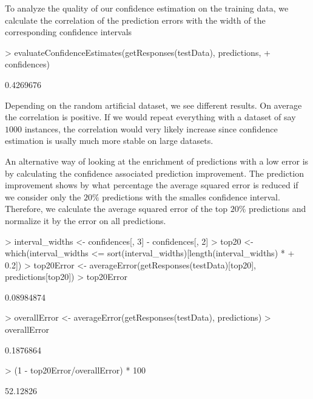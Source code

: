 \documentclass{article}
\begin{document}
To analyze the quality of our confidence estimation on the
training data, we calculate the correlation of the prediction
errors with the width of the corresponding confidence intervals

\begin{Schunk}
\begin{Sinput}
> evaluateConfidenceEstimates(getResponses(testData), predictions, 
+     confidences)
\end{Sinput}
\begin{Soutput}
[1] 0.4269676
\end{Soutput}
\end{Schunk}

Depending on the random artificial dataset, we see different
results.  On average the correlation is positive.
If we would repeat everything with
a dataset of say $1000$ instances, the correlation would very likely
increase since confidence estimation is usally much more stable on
large datasets.

An alternative way of looking at the enrichment of predictions with a
low error is by calculating the confidence associated prediction improvement.
The prediction improvement shows by what percentage the average
squared error is reduced if we consider only the $20\%$ predictions
with the smalles confidence interval.
Therefore, we calculate the average squared error of the top $20\%$
predictions and normalize it by the error on all predictions.

\begin{Schunk}
\begin{Sinput}
> interval_widths <- confidences[, 3] - confidences[, 2]
> top20 <- which(interval_widths <= sort(interval_widths)[length(interval_widths) * 
+     0.2])
> top20Error <- averageError(getResponses(testData)[top20], predictions[top20])
> top20Error
\end{Sinput}
\begin{Soutput}
[1] 0.08984874
\end{Soutput}
\begin{Sinput}
> overallError <- averageError(getResponses(testData), predictions)
> overallError
\end{Sinput}
\begin{Soutput}
[1] 0.1876864
\end{Soutput}
\begin{Sinput}
> (1 - top20Error/overallError) * 100
\end{Sinput}
\begin{Soutput}
[1] 52.12826
\end{Soutput}
\end{Schunk}
\end{document}
